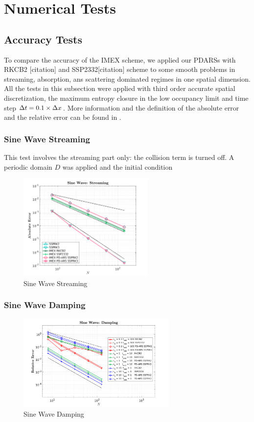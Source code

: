 \section{Numerical Tests}

\subsection{Accuracy Tests}
To compare the accuracy of the IMEX scheme, we applied our PDARSs with RKCB2 [citation] and SSP2332[citation] scheme to some smooth problems in streaming, absorption, ans scattering dominated regimes in one spatial dimension.
All the tests in this subsection were applied with third order accurate spatial discretization, the maximum entropy closure in the low occupancy limit and time step $\Delta t = 0.1 \times \Delta x $.
More information and the definition of the absolute error and the relative error can be found in \cite{Chu_2018}.

\subsubsection{Sine Wave Streaming}
This test involves the streaming part only: the collision term is turned off. 
A periodic domain $D$ was applied and the initial condition 
\begin{figure}[h]
  \centering
    \includegraphics[width=0.6\textwidth]{figures/SineWaveStreaming}
   \caption{Sine Wave Streaming}
\end{figure}

\subsubsection{Sine Wave Damping}
\begin{figure}[h]
  \centering
    \includegraphics[width=0.7\textwidth]{figures/SineWaveDamping}
   \caption{Sine Wave Damping}
\end{figure}
